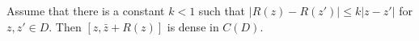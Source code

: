 
Assume that there is a constant $k < 1$ such that $|R(z) - R(z')| \leq k|z - z'|$ for $z, z' \in D$. Then $[z, \bar{z} + R(z)]$ is dense in $C(D)$.
